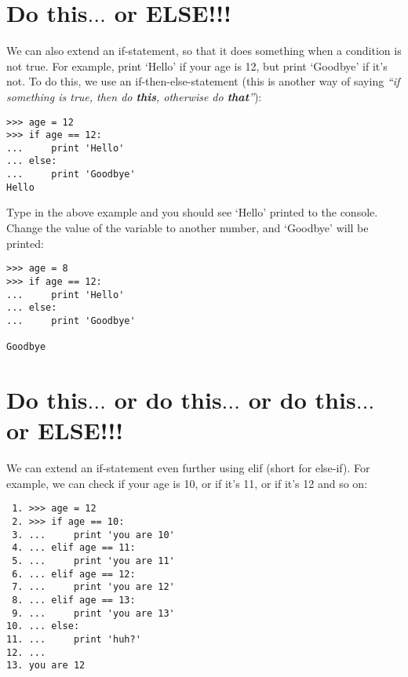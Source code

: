 \section{Do this$\ldots$ or ELSE!!!}

We can also extend an if-statement, so that it does something when a condition is not true.  For example, print `Hello' if your age is 12, but print `Goodbye' if it's not.  To do this, we use an if-then-else-statement (this is another way of saying \emph{``if something is true, then do \textbf{this}, otherwise do \textbf{that}''}):

\begin{listing}
\begin{verbatim}
>>> age = 12
>>> if age == 12:
...     print 'Hello'
... else:
...     print 'Goodbye'
Hello
\end{verbatim}
\end{listing}

Type in the above example and you should see `Hello' printed to the console.  Change the value of the variable  to another number, and `Goodbye' will be printed:

\begin{listing}
\begin{verbatim}
>>> age = 8
>>> if age == 12:
...     print 'Hello'
... else:
...     print 'Goodbye'

Goodbye
\end{verbatim}
\end{listing}

\section{Do this$\ldots$ or do this$\ldots$ or do this$\ldots$ or ELSE!!!}

We can extend an if-statement even further using elif (short for else-if). For example, we can check if your age is 10, or if it's 11, or if it's 12 and so on:

\begin{listing}
\begin{verbatim}
 1. >>> age = 12
 2. >>> if age == 10:
 3. ...     print 'you are 10'
 4. ... elif age == 11:
 5. ...     print 'you are 11'
 6. ... elif age == 12:
 7. ...     print 'you are 12'
 8. ... elif age == 13:
 9. ...     print 'you are 13'
10. ... else:
11. ...     print 'huh?'
12. ...
13. you are 12
\end{verbatim}
\end{listing}

